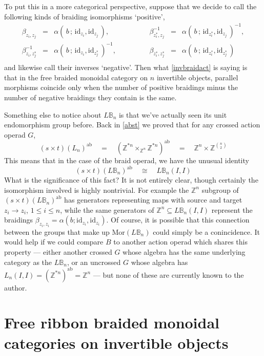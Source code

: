 \documentclass{amsbook} %
\newcommand{\id}{\textrm{id}}
\numberwithin{section}{chapter}
\begin{document}
To put this in a more categorical perspective, suppose that we decide to call the following kinds of braiding isomorphisms `positive',
\[ \begin{array}{rllcrll}
			\beta_{z_i, z_j} & = & \alpha( \, b \, ; \, \id_{z_i}, \id_{z_j} \, ), & \quad \quad \quad & \beta_{z_i^*, z_j}^{-1} & = & \alpha( \, b \, ; \, \id_{z_i^*}, \id_{z_j} \, )^{-1}, \\
			\beta_{z_i, z_j^*}^{-1} & = & \alpha( \, b \, ; \, \id_{z_i}, \id_{z_j^*} \, )^{-1}, & \quad \quad \quad & \beta_{z_i^*, z_j^*} & = & \alpha( \, b \, ; \, \id_{z_i^*}, \id_{z_j^*} \, ) \\
		\end{array}
\]
and likewise call their inverses `negative'. Then what \cref{invbraidact} is saying is that in the free braided monoidal category on $n$ invertible objects, parallel morphisms coincide only when the number of positive braidings minus the number of negative braidings they contain is the same.

Something else to notice about $L\mathbb{B}_n$ is that we've actually seen its unit endomorphism group before. Back in \cref{abst} we proved that for any crossed action operad $G$,
\[ (s \times t)(L_n)^{\mathrm{ab}} \quad = \quad (\mathbb{Z}^{\ast n} \times_{\mathbb{Z}^n} \mathbb{Z}^{\ast n})^{\mathrm{ab}} \quad = \quad \mathbb{Z}^n \times {\mathbb{Z}}^{{n}\choose{2}} \]
This means that in the case of the braid operad, we have the unusual identity
\[ (s \times t)(L\mathbb{B}_n)^{\mathrm{ab}} \quad \cong \quad L\mathbb{B}_n(I,I) \]
What is the significance of this fact? It is not entirely clear, though certainly the isomorphism involved is highly nontrivial. For example the $\mathbb{Z}^n$ subgroup of $(s \times t)(L\mathbb{B}_n)^{\mathrm{ab}}$ has generators representing maps with source and target $z_i \to z_i$, $1 \le i \le n$, while the same generators of $\mathbb{Z}^n \subseteq L\mathbb{B}_n(I,I)$ represent the braidings $\beta_{z_i, z_i} = \alpha( b;\id_{z_i}, \id_{z_i})$. Of course, it is possible that this connection between the groups that make up $\mathrm{Mor}(L\mathbb{B}_n)$ could simply be a conincidence. It would help if we could compare $B$ to another action operad which shares this property --- either another crossed $G$ whose algebra has the same underlying category as the $L\mathbb{B}_n$, or an uncrossed $G$ whose algebra has $L_n(I,I) = (\mathbb{Z}^{\ast n})^{\mathrm{ab}} = \mathbb{Z}^{n}$ --- but none of these are currently known to the author.

\section{Free ribbon braided monoidal categories on invertible objects}
\end{document}
